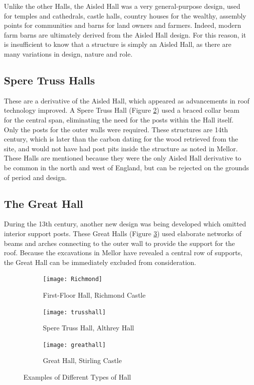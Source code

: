 \documentclass[letterpaper,11pt,titlepage]{article}
\begin{document}
{Unlike the other Halls, the Aisled Hall was a very general-purpose design, used for temples and cathedrals, castle halls, country houses for the wealthy, assembly points for communities and barns for land owners and farmers. Indeed, modern farm barns are ultimately derived from the Aisled Hall design. For this reason, it is insufficient to know that a structure is simply an Aisled Hall, as there are many variations in design, nature and role. 

\subsection{Spere Truss Halls}
These are a derivative of the Aisled Hall, which appeared as advancements in roof technology improved. A Spere Truss Hall (Figure \ref{fig:althrey}) used a braced collar beam for the central span, eliminating the need for the posts within the Hall itself. Only the posts for the outer walls were required. These structures are 14th century, which is later than the carbon dating for the wood retrieved from the site, and would not have had post pits inside the structure as noted in Mellor. These Halls are mentioned because they were the only Aisled Hall derivative to be common in the north and west of England, but can be rejected on the grounds of period and design.

\subsection{The Great Hall}
During the 13th century, another new design was being developed which omitted interior support posts. These Great Halls (Figure \ref{fig:greathall}) used elaborate networks of beams and arches connecting to the outer wall to provide the support for the roof. Because the excavations in Mellor have revealed a central row of supports, the Great Hall can be immediately excluded from consideration. 

\begin{figure}
	\centering
	\begin{subfigure}[b]{0.3\textwidth}
		\texttt{[image: Richmond]}
		\caption{First-Floor Hall, Richmond Castle}
		\label{fig:scolland}
	\end{subfigure}
	\begin{subfigure}[b]{0.3\textwidth}
		\texttt{[image: trusshall]}
		\caption{Spere Truss Hall, Althrey Hall}
		\label{fig:althrey}
	\end{subfigure}
	\begin{subfigure}[b]{0.3\textwidth}
		\texttt{[image: greathall]}
		\caption{Great Hall, Stirling Castle}
		\label{fig:greathall}
	\end{subfigure}
	\caption{Examples of Different Types of Hall}\label{fig:different}
\end{figure}

}
\end{document}
